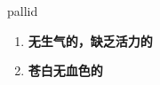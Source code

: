 
\begin{frame}
{\huge pallid}
\begin{center}
\begin{enumerate}\Large
  \item \textbf{无生气的，缺乏活力的}
  \item \textbf{苍白无血色的}
\end{enumerate}
\end{center}
\end{frame}
